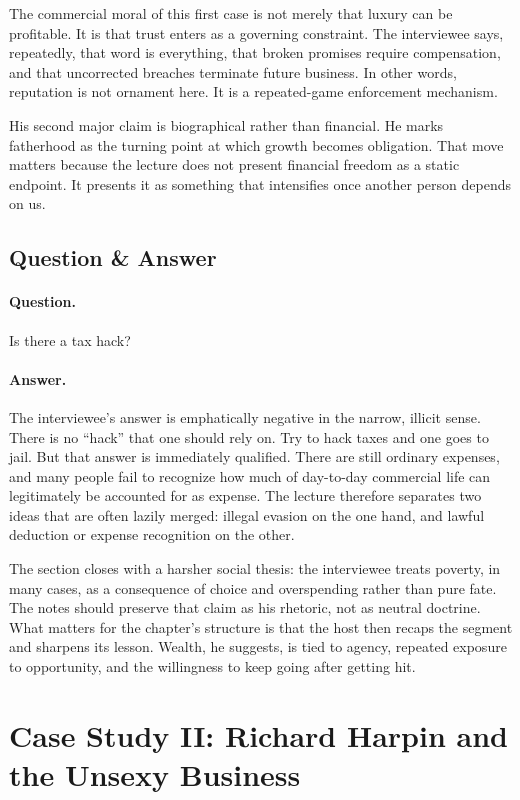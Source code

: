 The commercial moral of this first case is not merely that luxury can be profitable. It is that trust enters as a governing constraint. The interviewee says, repeatedly, that word is everything, that broken promises require compensation, and that uncorrected breaches terminate future business. In other words, reputation is not ornament here. It is a repeated-game enforcement mechanism.

His second major claim is biographical rather than financial. He marks fatherhood as the turning point at which growth becomes obligation. That move matters because the lecture does not present financial freedom as a static endpoint. It presents it as something that intensifies once another person depends on us.

\subsection{Question \& Answer}

\paragraph{Question.} Is there a tax hack?

\paragraph{Answer.} The interviewee's answer is emphatically negative in the narrow, illicit sense. There is no ``hack'' that one should rely on. Try to hack taxes and one goes to jail. But that answer is immediately qualified. There are still ordinary expenses, and many people fail to recognize how much of day-to-day commercial life can legitimately be accounted for as expense. The lecture therefore separates two ideas that are often lazily merged: illegal evasion on the one hand, and lawful deduction or expense recognition on the other.

The section closes with a harsher social thesis: the interviewee treats poverty, in many cases, as a consequence of choice and overspending rather than pure fate. The notes should preserve that claim as his rhetoric, not as neutral doctrine. What matters for the chapter's structure is that the host then recaps the segment and sharpens its lesson. Wealth, he suggests, is tied to agency, repeated exposure to opportunity, and the willingness to keep going after getting hit.

\section{Case Study II: Richard Harpin and the Unsexy Business}

